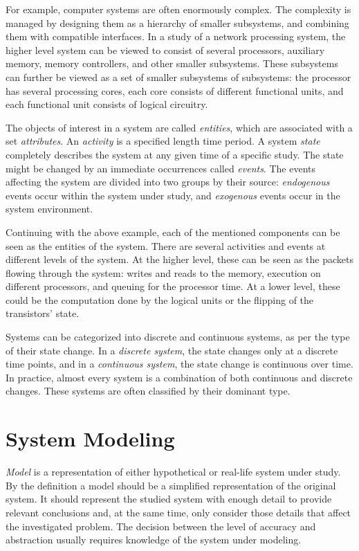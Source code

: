 For example, computer systems are often enormously complex. The complexity is managed by designing them as a hierarchy of smaller subsystems, and combining them with compatible interfaces. In a study of a network processing system, the higher level system can be viewed to consist of several processors, auxiliary memory, memory controllers, and other smaller subsystems. These subsystems can further be viewed as a set of smaller subsystems of subsystems: the processor has several processing cores, each core consists of different functional units, and each functional unit consists of logical circuitry.~\cite{Banks:2010:DES}

The objects of interest in a system are called \emph{entities}, which are associated with a set \emph{attributes}. An \emph{activity} is a specified length time period. A system \emph{state} completely describes the system at any given time of a specific study. The state might be changed by an immediate occurrences called \emph{events}. The events affecting the system are divided into two groups by their source: \emph{endogenous} events occur within the system under study, and \emph{exogenous} events occur in the system environment.~\cite{Banks:2010:DES}

Continuing with the above example, each of the mentioned components can be seen as the entities of the system. There are several activities and events at different levels of the system. At the higher level, these can be seen as the packets flowing through the system: writes and reads to the memory, execution on different processors, and queuing for the processor time. At a lower level, these could be the computation done by the logical units or the flipping of the transistors' state.

Systems can be categorized into discrete and continuous systems, as per the type of their state change. In a \emph{discrete system}, the state changes only at a discrete time points, and in a \emph{continuous system}, the state change is continuous over time. In practice, almost every system is a combination of both continuous and discrete changes. These systems are often classified by their dominant type.~\cite{Banks:2010:DES}


\section{System Modeling}
\label{sec:system-modeling}

\emph{Model} is a representation of either hypothetical or real-life system under study. By the definition a model should be a simplified representation of the original system. It should represent the studied system with enough detail to provide relevant conclusions and, at the same time, only consider those details that affect the investigated problem. The decision between the level of accuracy and abstraction usually requires knowledge of the system under modeling.~\cite{Banks:2010:DES}

